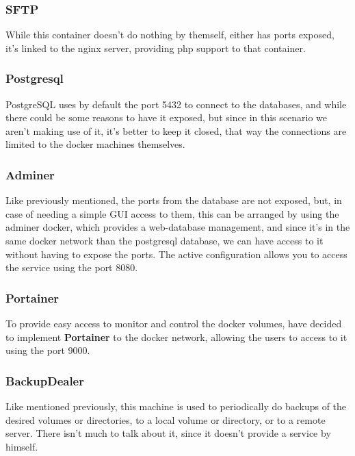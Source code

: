     \subsubsection[PHP]{SFTP}
    \begin{flushleft}
        While this container doesn't do nothing by themself, either has ports exposed, it's linked to the nginx server, providing php support
        to that container.
    \end{flushleft}

    \subsubsection[Postgresql]{Postgresql}
    \begin{flushleft}
        PostgreSQL uses by default the port 5432 to connect to the databases, and while there could be some reasons to
        have it exposed, but since in this scenario we aren't making use of it, it's better to keep it closed, that way
        the connections are limited to the docker machines themselves.
    \end{flushleft}
    \newpage
    \subsubsection[Adminer]{Adminer}
    \begin{flushleft}
        Like previously mentioned, the ports from the database are not exposed, but, in case of needing a simple GUI
        access to them, this can be arranged by using the adminer docker, which provides a web-database management,
        and since it's in the same docker network than the postgresql database, we can have access to it without having
        to expose the ports.
        The active configuration allows you to access the service using the port 8080.
    \end{flushleft}

    \subsubsection[Portainer]{Portainer}
    \begin{flushleft}
        To provide easy access to monitor and control the docker volumes, have decided to implement \textbf{Portainer}
        to the docker network, allowing the users to access to it using the port 9000.
    \end{flushleft}


    \subsubsection[Backup\_dealer]{BackupDealer}
    \begin{flushleft}
       Like mentioned previously, this machine is used to periodically do backups of the desired volumes or directories,
       to a local volume or directory, or to a remote server.
       There isn't much to talk about it, since it doesn't provide a service by himself.
    \end{flushleft}

